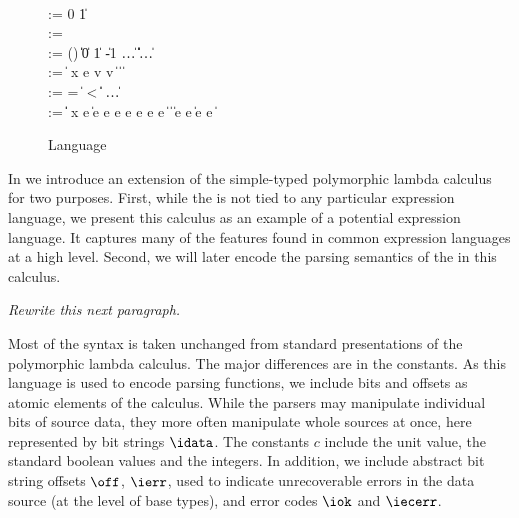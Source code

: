 \begin{figure}[tp]
\small
\begin{bnf}
    \\

        \::= 0 \| 1 \\ 
       \::=  \\ 
    \::=
      () \| \itrue \| \ifalse \| 0 \| 1 \| -1 \| \dots \nlalt
      \ierr \| \data \| \off \| \iok \| \iecerr \| \ldots \\

    \::= 
      \const \| %
       {\nrm x} e \nlalt
      \ipair v v \|  \|  \nlalt
       \|  \\

    \::= 
      = \; \| \; < \; \| \inotop \| \isizeofop
      \| \ldots \\

    \::= 
      \const \| \var \|  \nlalt
       {\nrm x} e \| 
      \iapp e e \nlalt
       e \; e \nlalt
      \iif e \; \ithen e \; \ielse e \nlalt
       \|  \nlalt
       \|  \nlalt
       \nlalt
       \| \iappend e e \| \isub e {\nrm e} \nlalt
       \|       
\end{bnf}
\caption{\Implang{} Language}
\label{fig:implang-syntax}
\end{figure}

In  we introduce an extension of the
simple-typed polymorphic lambda calculus for two purposes. First,
while the \ddc{} is not tied to any particular expression language, we
present this calculus as an example of a potential expression
language.  It captures many of the features found in common expression
languages at a high level. Second, we will later encode the parsing
semantics of the \ddc{} in this calculus.

{\em Rewrite this next paragraph.}

Most of the syntax is taken unchanged from standard presentations of
the polymorphic lambda calculus. The major differences are in the
constants. As this language is used to encode parsing functions, we
include bits and offsets as atomic elements of the calculus. While the
parsers may manipulate individual bits of source data, they more often
manipulate whole sources at once, here represented by bit strings
$\idata$. 
The constants $c$ include the unit value, the standard boolean values
and the integers. In addition, we include abstract bit string offsets
$\off$, $\ierr$, used to indicate unrecoverable errors in the data
source (at the level of base types), and error codes $\iok$ and $\iecerr$.

